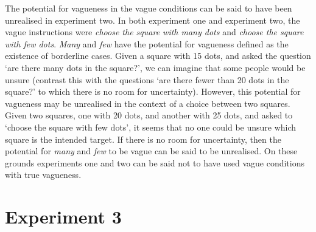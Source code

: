 \documentclass[man,floatmark]{apa}
\begin{document}

The potential for vagueness in the vague conditions can be said to have been unrealised in experiment two. In both experiment one and experiment two, the vague instructions were  \emph{choose the square with many dots} and \emph{choose the square with few dots}. \emph{Many} and \emph{few} have the potential for vagueness defined as the existence of borderline cases. Given a square with 15 dots, and asked the question `are there many dots in the square?', we can imagine that some people would be unsure (contrast this with the questions `are there fewer than 20 dots in the square?' to which there is no room for uncertainty). However, this potential for vagueness may be unrealised in the context of a choice between two squares. Given two squares, one with 20 dots, and another with 25 dots, and asked to `choose the square with few dots', it seems that no one could be unsure which square is the intended target. If there is no room for uncertainty, then the potential for \emph{many} and \emph{few} to be vague can be said to be unrealised. On these grounds experiments one and two can be said not to have used vague conditions with true vagueness.

\section{Experiment 3}
\end{document}
